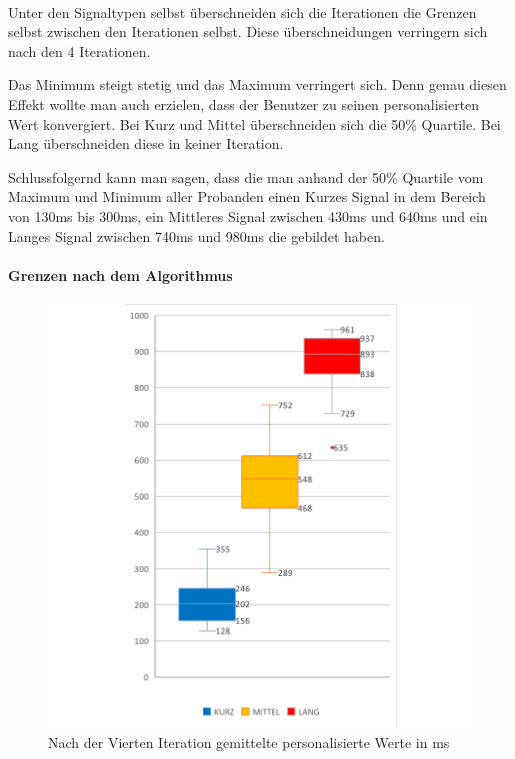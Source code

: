 \\

Unter den Signaltypen selbst {\"u}berschneiden sich die Iterationen die Grenzen selbst zwischen den Iterationen selbst. Diese {\"u}berschneidungen verringern sich nach den 4 Iterationen.

Das Minimum steigt stetig und das Maximum verringert sich. Denn genau diesen Effekt wollte man auch erzielen, dass der Benutzer zu seinen personalisierten Wert konvergiert.
Bei Kurz und Mittel {\"u}berschneiden sich die 50\% Quartile. Bei Lang {\"u}berschneiden diese in keiner Iteration.

Schlussfolgernd kann man sagen, dass die man anhand der 50\% Quartile vom Maximum und Minimum aller Probanden einen Kurzes Signal in dem Bereich von 130ms bis 300ms, ein Mittleres Signal zwischen 430ms und 640ms und ein Langes Signal zwischen 740ms und 980ms die gebildet haben. 


\paragraph{Grenzen nach dem Algorithmus}

\begin{figure}[htbp] 
            \centering
   	\includegraphics[width=\textwidth]{pics/analyse/algo/MinMax/GrenzenNachAlgo.png}
	\caption{Nach der Vierten Iteration gemittelte personalisierte Werte in ms}
	\label{fig:GrenzenNachAlgo}
\end{figure}

